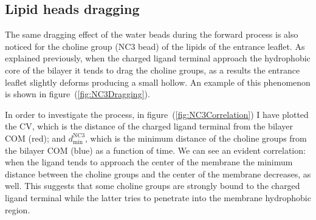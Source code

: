 \subsection{Lipid heads dragging}
The same dragging effect of the water beads during the forward process is also noticed for the choline group (NC$3$ \martini bead) of the lipids of the entrance leaflet. As explained previously, when the charged ligand terminal approach the hydrophobic core of the bilayer it tends to drag the choline groups, as a results the entrance leaflet slightly deforms producing a small hollow. An example of this phenomenon is shown in figure~(\ref{fig:NC3Dragging}). 

In order to investigate the process, in figure~(\ref{fig:NC3Correlation}) I have plotted the \ac{CV}, which is the distance of the charged ligand terminal from the bilayer \ac{COM} (red); and $d_\text{min}^{\text{NC}3}$, which is the minimum distance of the choline groups from the bilayer \ac{COM} (blue) as a function of time. We can see an evident correlation: when the ligand tends to approach the center of the membrane the minimum distance between the choline groups and the center of the membrane decreases, as well. This suggests that some choline groups are strongly bound to the charged ligand terminal while the latter tries to penetrate into the membrane hydrophobic region. 
